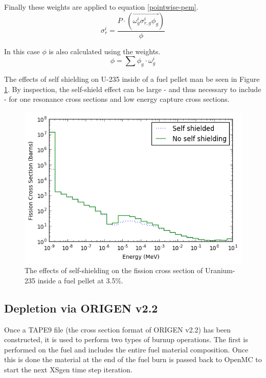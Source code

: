 \documentclass{article}
\begin{document}
Finally these weights are applied to equation \ref{pointwise-pem}.
\begin{equation}
\label{ssww}
\sigma_{r}^i=\frac{P \cdot (\overrightarrow{\omega_g^i\sigma_{r,g}^i \phi_g})}{\phi}
\end{equation}

In this case $\phi$ is also calculated using the weights. 
\begin{equation}
\label{phiw}
\phi=\sum\phi_g \cdot \omega_g^i
\end{equation}

The effects of self shielding on U-235 inside of a fuel pellet man be seen in
Figure \ref{fig:index}. By inspection, the self-shield effect can be large - and thus
necessary to include - for one resonance cross sections and low energy capture cross sections.
\begin{figure}[h]
  \center
  \includegraphics[scale=0.6]{index.png}
  \caption{The effects of self-shielding on the fission cross section of Uranium-235 inside a fuel pellet at 3.5\%.}
  \label{fig:index}
\end{figure}

\subsection{Depletion via ORIGEN v2.2}
\label{sec:origen}

Once a TAPE9 file (the cross section format of ORIGEN v2.2) has been constructed, it is
used to perform two types of burnup operations. The first is performed on the fuel and
includes the entire fuel material composition. Once this is done the material at the
end of the fuel burn is passed back to OpenMC to start the next XSgen time step iteration.
\end{document}
